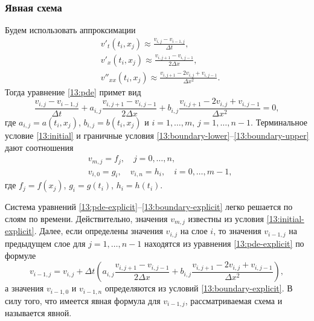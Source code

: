 \subsubsection{Явная схема}
Будем использовать аппроксимации
\begin{align}
\label{13:explicit-t}
&v'_t(t_i, x_j) \approx \frac{v_{i,j} - v_{i-1,j}}{\Delta t},\\
\label{13:explicit-x}
&v'_x(t_i, x_j) \approx \frac{v_{i,j+1} - v_{i,j-1}}{2\Delta x},\\
\label{13:explicit-xx}
&v''_{xx}(t_i, x_j) \approx \frac{v_{i,j+1} - 2v_{i,j} + v_{i,j-1}}{\Delta x^2}.
\end{align}
Тогда уравнение \eqref{13:pde} примет вид
\begin{equation}
\label{13:pde-explicit}
\frac{v_{i,j} - v_{i-1,j}}{\Delta t} + a_{i,j} \frac{v_{i,j+1} - v_{i,j-1}}{2\Delta x} + b_{i,j} \frac{v_{i,j+1} - 2v_{i,j} + v_{i,j-1}}{\Delta x^2}=0,
\end{equation}
где $a_{i,j} = a(t_i, x_j)$, $b_{i,j} = b(t_i, x_j)$ и $i=1,\ldots,m$, $j=1,\ldots,n-1$.
Терминальное условие \eqref{13:initial} и граничные условия \eqref{13:boundary-lower}--\eqref{13:boundary-upper} дают соотношения
\begin{align}
\label{13:initial-explicit}
&v_{m,j} = f_j,\quad j=0,\ldots,n,\\
\label{13:boundary-explicit}
&v_{i,0} = g_i,\quad v_{i,n} = h_i,\quad i=0,\ldots,m-1,
\end{align}
где $f_j = f(x_j)$, $g_i = g(t_i)$, $h_i = h(t_i)$. 

Система уравнений \eqref{13:pde-explicit}--\eqref{13:boundary-explicit} легко решается по слоям по времени.
Действительно, значения $v_{m,j}$ известны из условия \eqref{13:initial-explicit}.
Далее, если определены значения $v_{i,j}$ на слое $i$, то значения $v_{i-1,j}$ на предыдущем слое для $j=1,\dots,n-1$ находятся из уравнения \eqref{13:pde-explicit} по формуле
\[
v_{i-1,j} = v_{i,j} + \Delta t \left( a_{i,j} \frac{v_{i,j+1} - v_{i,j-1}}{2\Delta x} + b_{i,j} \frac{v_{i,j+1} - 2v_{i,j} + v_{i,j-1}}{\Delta x^2}\right),
\]
а значения $v_{i-1,0}$ и $v_{i-1,n}$ определяются из условий \eqref{13:boundary-explicit}.
В силу того, что имеется явная формула для $v_{i-1,j}$, рассматриваемая схема и называется явной.


